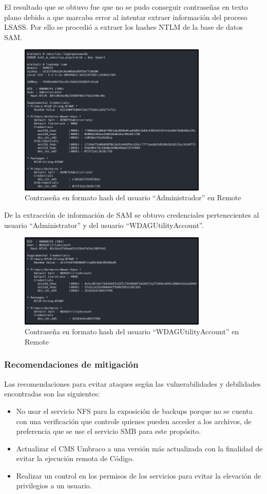 El resultado que se obtuvo fue que no se pudo conseguir contraseñas en texto plano debido a que marcaba error al intentar extraer información del proceso LSASS. Por ello se procedió a extraer los hashes NTLM de la base de datos SAM.
\begin{figure}[H]
    \centering
    \includegraphics[width=0.8\textwidth]{imagenes/hasadrem.png}
    \caption{Contraseña en formato hash del usuario ``Administrador'' en Remote}
\end{figure}
De la extracción de información de SAM se obtuvo credenciales pertenecientes al usuario “Administrator” y del usuario “WDAGUtilityAccount”.
\begin{figure}[H]
    \centering
    \includegraphics[width=0.8\textwidth]{imagenes/haswdarem.png}
    \caption{Contraseña en formato hash del usuario ``WDAGUtilityAccount'' en Remote}
\end{figure}
\subsubsection{Recomendaciones de mitigación}
Las recomendaciones para evitar ataques según las vulnerabilidades y debilidades encontradas son las siguientes:
\begin{itemize}
    \item No usar el servicio NFS para la exposición de backups porque no se cuenta con una verificación que controle quienes pueden acceder a los archivos, de preferencia que se use el servicio SMB para este propósito.
    \item Actualizar el CMS Umbraco a una versión más actualizada con la finalidad de evitar la ejecución remota de Código.
    \item Realizar un control en los permisos de los servicios para evitar la elevación de privilegios a un usuario.
\end{itemize}
